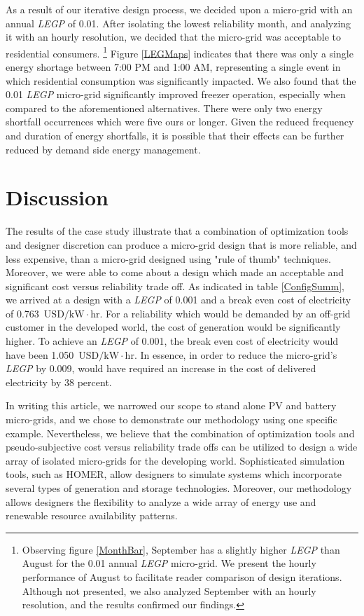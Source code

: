 \documentclass[11p]{article}
\newcommand{\unit}[1]{\ensuremath{\, \mathrm{#1}}}
\begin{document}
As a result of our iterative design process, we decided upon a micro-grid with an annual \emph{LEGP} of 0.01. After isolating the lowest reliability month, and analyzing it with an hourly resolution, we decided that the micro-grid was acceptable to residential consumers. 
%
%
\footnote{Observing figure \ref{MonthBar}, September has a slightly higher \emph{LEGP} than August for the 0.01 annual \emph{LEGP} micro-grid. 
We present the hourly performance of August to facilitate reader comparison of design iterations. 
Although not presented, we also analyzed September with an hourly resolution, and the results confirmed our findings.}
%
%
%
Figure \ref{LEGMaps} indicates that there was only a single energy shortage between 7:00 PM and 1:00 AM, representing a single event in which residential consumption was significantly impacted.
We also found that the 0.01 \emph{LEGP} micro-grid significantly improved freezer operation, especially when compared to the aforementioned alternatives. There were only two energy shortfall occurrences which were five ours or longer. 
Given the reduced frequency and duration of energy shortfalls, it is possible that their effects can be further reduced by demand side energy management.

\section{Discussion} \label{Discussion}

The results of the case study illustrate that a combination of optimization tools and designer discretion can produce a micro-grid design that is more reliable, and less expensive, than a micro-grid designed using "rule of thumb" techniques. 
Moreover, we were able to come about a design which made an acceptable and significant cost versus reliability trade off.
As indicated in table \ref{ConfigSumm}, we arrived at a design with a \emph{LEGP} of 0.001 and a break even cost of electricity of 0.763 \unit{USD/kW \! \cdot \! hr}.   
For a reliability which would be demanded by an off-grid customer in the developed world, the cost of generation would be significantly higher. 
To achieve an \emph{LEGP} of 0.001, the break even cost of electricity would have been 1.050 \unit{USD/kW \! \cdot \! hr}.
In essence, in order to reduce the micro-grid's \emph{LEGP} by 0.009, would have required an increase in the cost of delivered electricity by 38 percent.   

In writing this article, we narrowed our scope to stand alone PV and battery micro-grids, and we chose to demonstrate our methodology using one specific example. 
Nevertheless, we believe that the combination of optimization tools and pseudo-subjective cost versus reliability trade offs can be utilized to design a wide array of isolated micro-grids for the developing world. 
Sophisticated simulation tools, such as HOMER, allow designers to simulate systems which incorporate several types of generation and storage technologies. 
Moreover, our methodology allows designers the flexibility to analyze a wide array of energy use and renewable resource availability patterns.
\end{document}
